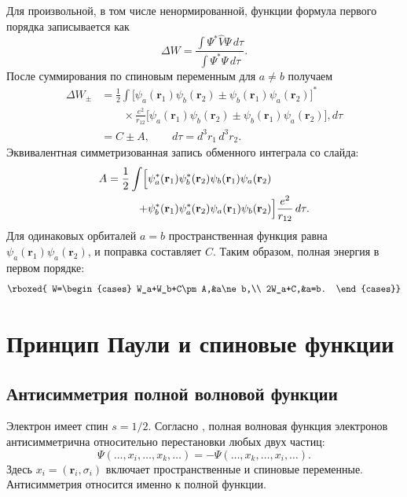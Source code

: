 \documentclass[../final.tex]{subfiles}
\begin{document}
Для произвольной, в том числе ненормированной, функции
формула первого порядка записывается как
\begin{equation*}
    \Delta W=
    \frac{\int\Psi^{*}\hat V\Psi\,d\tau}
         {\int\Psi^{*}\Psi\,d\tau}.
\end{equation*}
После суммирования по спиновым переменным для \(a\ne b\) получаем
\begin{align*}
    \Delta W_\pm
    &=\frac12\int
    \bigl[\psi_a(\mathbf r_1)\psi_b(\mathbf r_2)
    \pm\psi_b(\mathbf r_1)\psi_a(\mathbf r_2)\bigr]^{*}\\
    &\qquad\times\frac{e^2}{r_{12}}
    \bigl[\psi_a(\mathbf r_1)\psi_b(\mathbf r_2)
    \pm\psi_b(\mathbf r_1)\psi_a(\mathbf r_2)\bigr],d\tau\\
    &=C\pm A,
    \qquad d\tau=d^3r_1\,d^3r_2.
\end{align*}
Эквивалентная симметризованная запись обменного интеграла со слайда:
\begin{align*}
    A=\frac12\int\Bigl[
    &\psi_a^{*}(\mathbf r_1)\psi_b^{*}(\mathbf r_2)
     \psi_b(\mathbf r_1)\psi_a(\mathbf r_2)\\
    +{}&\psi_b^{*}(\mathbf r_1)\psi_a^{*}(\mathbf r_2)
     \psi_a(\mathbf r_1)\psi_b(\mathbf r_2)
    \Bigr]\frac{e^2}{r_{12}}\,d\tau.
\end{align*}
Для одинаковых орбиталей \(a=b\) пространственная функция равна
\(\psi_a(\mathbf r_1)\psi_a(\mathbf r_2)\), и поправка составляет \(C\).
Таким образом, полная энергия в первом порядке:
\begin{equation*}
    \rboxed{
    W=\begin{cases}
        W_a+W_b+C\pm A,&a\ne b,\\
        2W_a+C,&a=b.
    \end{cases}}
\end{equation*}

\section{Принцип Паули и спиновые функции}

\subsection{Антисимметрия полной волновой функции}

Электрон имеет спин \(s=1/2\). Согласно ,
полная волновая функция электронов антисимметрична относительно
перестановки любых двух частиц:
\begin{equation*}
    \Psi(\ldots,x_i,\ldots,x_k,\ldots)
    =-\Psi(\ldots,x_k,\ldots,x_i,\ldots).
\end{equation*}
Здесь \(x_i=(\mathbf r_i,\sigma_i)\) включает пространственные
и спиновые переменные. Антисимметрия относится именно к полной функции.
\end{document}

